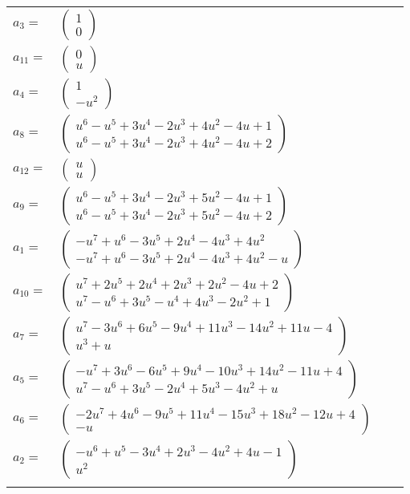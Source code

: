 \documentclass[1p]{elsarticle_modified}
\theoremstyle{definition}
\begin{document}
\begin{tabular}{m{7pt} m{180pt} m{7pt} m{180pt} }
\flushright $a_{3}=$&$\begin{pmatrix}1\\0\end{pmatrix}$ \\
\flushright $a_{11}=$&$\begin{pmatrix}0\\u\end{pmatrix}$ \\
\flushright $a_{4}=$&$\begin{pmatrix}1\\- u^2\end{pmatrix}$ \\
\flushright $a_{8}=$&$\begin{pmatrix}u^6- u^5+3 u^4-2 u^3+4 u^2-4 u+1\\u^6- u^5+3 u^4-2 u^3+4 u^2-4 u+2\end{pmatrix}$ \\
\flushright $a_{12}=$&$\begin{pmatrix}u\\u\end{pmatrix}$ \\
\flushright $a_{9}=$&$\begin{pmatrix}u^6- u^5+3 u^4-2 u^3+5 u^2-4 u+1\\u^6- u^5+3 u^4-2 u^3+5 u^2-4 u+2\end{pmatrix}$ \\
\flushright $a_{1}=$&$\begin{pmatrix}- u^7+u^6-3 u^5+2 u^4-4 u^3+4 u^2\\- u^7+u^6-3 u^5+2 u^4-4 u^3+4 u^2- u\end{pmatrix}$ \\
\flushright $a_{10}=$&$\begin{pmatrix}u^7+2 u^5+2 u^4+2 u^3+2 u^2-4 u+2\\u^7- u^6+3 u^5- u^4+4 u^3-2 u^2+1\end{pmatrix}$ \\
\flushright $a_{7}=$&$\begin{pmatrix}u^7-3 u^6+6 u^5-9 u^4+11 u^3-14 u^2+11 u-4\\u^3+u\end{pmatrix}$ \\
\flushright $a_{5}=$&$\begin{pmatrix}- u^7+3 u^6-6 u^5+9 u^4-10 u^3+14 u^2-11 u+4\\u^7- u^6+3 u^5-2 u^4+5 u^3-4 u^2+u\end{pmatrix}$ \\
\flushright $a_{6}=$&$\begin{pmatrix}-2 u^7+4 u^6-9 u^5+11 u^4-15 u^3+18 u^2-12 u+4\\- u\end{pmatrix}$ \\
\flushright $a_{2}=$&$\begin{pmatrix}- u^6+u^5-3 u^4+2 u^3-4 u^2+4 u-1\\u^2\end{pmatrix}$\\&\end{tabular}
\end{document}
